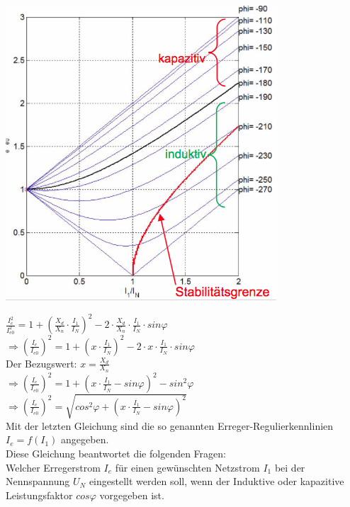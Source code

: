 
\begin{minipage}{0.25 \linewidth}
\includegraphics[width =  \linewidth]{./Pics/VL910/regulierkennlinie}
\end{minipage}
\begin{minipage}{0.75 \linewidth}
$\frac{I_e^2}{I_{e0}^2} = 1 + (\frac{X_d}{X_n} \cdot \frac{I_1}{I_N})^2 - 2 \cdot \frac{X_d}{X_n} \cdot \frac{I_1}{I_N} \cdot sin\varphi$\\

$\Rightarrow (\frac{I_e}{I_{e0}})^2 = 1 + (x \cdot \frac{I_1}{I_N})^2 - 2 \cdot x \cdot \frac{I_1}{I_N} \cdot sin\varphi$ \\

Der Bezugswert: $x=\frac{X_d}{X_n}$ \\

$\Rightarrow (\frac{I_e}{I_{e0}})^2 = 1 + (x \cdot \frac{I_1}{I_N} - sin\varphi)^2 - sin^2\varphi$ \\

$\Rightarrow (\frac{I_e}{I_{e0}})^2 = \sqrt{cos^2\varphi + (x \cdot \frac{I_1}{I_N} - sin\varphi)^2}$ \\

Mit der letzten Gleichung sind die so genannten Erreger-Regulierkennlinien $I_e = f(I_1)$ angegeben. \\

Diese Gleichung beantwortet die folgenden Fragen: \\
Welcher Erregerstrom $I_e$ für einen gewünschten Netzstrom $I_1$ bei der Nennspannung $U_N$ eingestellt werden soll, wenn der Induktive oder kapazitive Leistungsfaktor $cos \varphi$ vorgegeben ist. 
\end{minipage}

